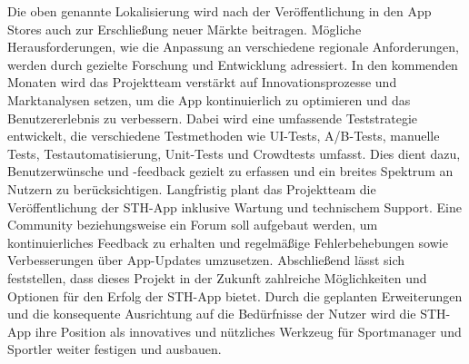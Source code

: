 Die oben genannte Lokalisierung wird nach der Veröffentlichung in den App Stores auch zur Erschließung neuer Märkte beitragen. Mögliche Herausforderungen, wie die Anpassung an verschiedene regionale Anforderungen, werden durch gezielte Forschung und Entwicklung adressiert.
In den kommenden Monaten wird das Projektteam verstärkt auf Innovationsprozesse und Marktanalysen setzen, um die App kontinuierlich zu optimieren und das Benutzererlebnis zu verbessern. Dabei wird eine umfassende Teststrategie entwickelt, die verschiedene Testmethoden wie UI-Tests, A/B-Tests, manuelle Tests, Testautomatisierung, Unit-Tests und Crowdtests umfasst. Dies dient dazu, Benutzerwünsche und -feedback gezielt zu erfassen und ein breites Spektrum an Nutzern zu berücksichtigen.
Langfristig plant das Projektteam die Veröffentlichung der STH-App inklusive Wartung und technischem Support. Eine Community beziehungsweise ein Forum soll aufgebaut werden, um kontinuierliches Feedback zu erhalten und regelmäßige Fehlerbehebungen sowie Verbesserungen über App-Updates umzusetzen.\newline
Abschließend lässt sich feststellen, dass dieses Projekt in der Zukunft zahlreiche Möglichkeiten und Optionen für den Erfolg der STH-App bietet. Durch die geplanten Erweiterungen und die konsequente Ausrichtung auf die Bedürfnisse der Nutzer wird die STH-App ihre Position als innovatives und nützliches Werkzeug für Sportmanager und Sportler weiter festigen und ausbauen.